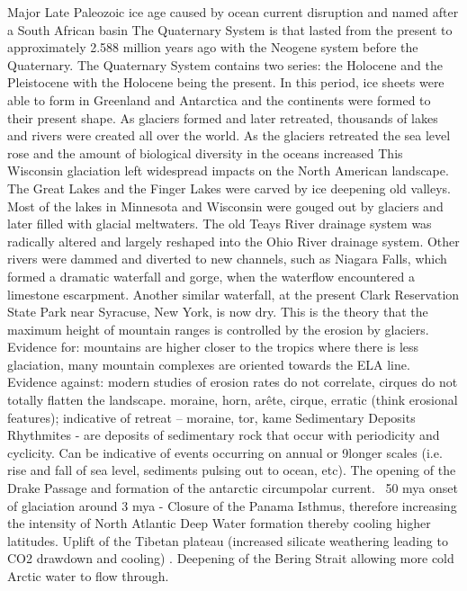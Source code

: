 		Major Late Paleozoic ice age caused by ocean current disruption and named after a South African basin
		The Quaternary System is that lasted from the present to approximately 2.588 million years ago with the Neogene system before the Quaternary. The Quaternary System contains two series: the Holocene and the Pleistocene with the Holocene being the present. In this period, ice sheets were able to form in Greenland and Antarctica and the continents were formed to their present shape. As glaciers formed and later retreated, thousands of lakes and rivers were created all over the world. As the glaciers retreated the sea level rose and the amount of biological diversity in the oceans increased
		This Wisconsin glaciation left widespread impacts on the North American landscape. The Great Lakes and the Finger Lakes were carved by ice deepening old valleys. Most of the lakes in Minnesota and Wisconsin were gouged out by glaciers and later filled with glacial meltwaters. The old Teays River drainage system was radically altered and largely reshaped into the Ohio River drainage system. Other rivers were dammed and diverted to new channels, such as Niagara Falls, which formed a dramatic waterfall and gorge, when the waterflow encountered a limestone escarpment. Another similar waterfall, at the present Clark Reservation State Park near Syracuse, New York, is now dry.
    			This is the theory that the maximum height of mountain ranges is controlled by the erosion by glaciers. Evidence for: mountains are higher closer to the tropics where there is less glaciation, many mountain complexes are oriented towards the ELA line. Evidence against: modern studies of erosion rates do not correlate, cirques do not totally flatten the landscape. 
    			moraine, horn, arête, cirque, erratic (think erosional features); indicative of retreat – moraine, tor, kame Sedimentary Deposits Rhythmites - are deposits of sedimentary rock that occur with periodicity and cyclicity. Can be indicative of events occurring on annual or 9longer scales (i.e. rise and fall of sea level, sediments pulsing out to ocean, etc). 
    			The opening of the Drake Passage and formation of the antarctic circumpolar current. ~50 mya onset of glaciation around 3 mya - Closure of the Panama Isthmus, therefore increasing the intensity of North Atlantic Deep Water formation thereby cooling higher latitudes. Uplift of the Tibetan plateau (increased silicate weathering leading to CO2 drawdown and cooling) . Deepening of the Bering Strait allowing more cold Arctic water to flow through. 
